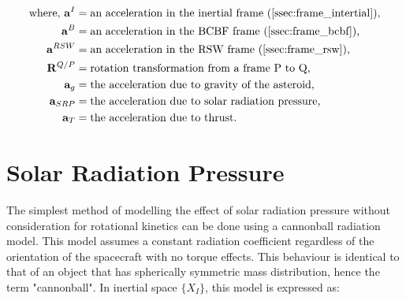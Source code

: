\begin{equation*}
    \begin{aligned}
        \textrm{where, }
        \mathbf{a}^I &= \textrm{an acceleration in the inertial frame (\autoref{ssec:frame_intertial}),}\\
        \mathbf{a}^B &= \textrm{an acceleration in the BCBF frame (\autoref{ssec:frame_bcbf}),}\\
        \mathbf{a}^{RSW} &= \textrm{an acceleration in the RSW frame (\autoref{ssec:frame_rsw}),}\\
        \mathbf{R}^{Q/P} &= \textrm{rotation transformation from a frame P to Q,}\\
        \mathbf{a}_g &= \textrm{the acceleration due to gravity of the asteroid,}\\
        \mathbf{a}_{SRP} &= \textrm{the acceleration due to solar radiation pressure,}\\
        \mathbf{a}_T &= \textrm{the acceleration due to thrust.}\\
    \end{aligned}
\end{equation*}


% 





\section{Solar Radiation Pressure}

The simplest method of modelling the effect of solar radiation pressure without consideration for rotational kinetics can be done using a cannonball radiation model. This model assumes a constant radiation coefficient regardless of the orientation of the spacecraft with no torque effects. This behaviour is identical to that of an object that has spherically symmetric mass distribution, hence the term "cannonball". In inertial space $\{X_I\}$, this model is expressed as:

